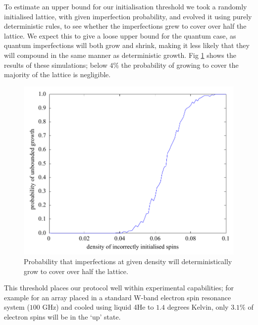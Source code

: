To estimate an upper bound for our initialisation threshold we took a randomly initialised lattice, with given imperfection probability, and evolved it using purely deterministic rules, to see whether the imperfections grew to cover over half the lattice. We expect this to give a loose upper bound for the quantum case, as quantum imperfections will both grow and shrink, making it less likely that they will compound in the same manner as deterministic growth. Fig \ref{flipthreshold} shows the results of these simulations; below $4\%$ the probability of growing to cover the majority of the lattice is negligible.
\begin{figure}[!h]
  \begin{center}
    \includegraphics[scale=0.5]{assets/flipthreshold.pdf}
  \end{center}
  \caption{Probability that imperfections at given density will deterministically grow to cover over half the lattice.}
  \label{flipthreshold}
\end{figure}

This threshold places our protocol well within experimental capabilities; for example for an array placed in a standard W-band electron spin resonance system ($100$ GHz) and cooled using liquid 4He to $1.4$ degrees Kelvin, only $3.1\%$ of electron spins will be in the `up' state.


